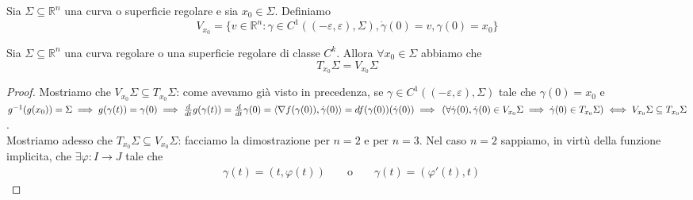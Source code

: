 \begin{definition}
Sia $\Sigma \subseteq \mathbb{R}^n$ una curva o superficie regolare e sia $x_0 \in \Sigma$. Definiamo
$$
V_{x_0} = \{ v \in \mathbb{R}^n: \gamma \in C^{1}((-\varepsilon, \varepsilon), \Sigma), \dot{\gamma}(0) = v, \gamma(0) = x_0 \}
$$
\end{definition}
\begin{theorem}
Sia $\Sigma \subseteq \mathbb{R}^n$ una curva regolare o una superficie regolare di classe $C^k$. Allora $\forall x_0 \in \Sigma$ abbiamo che
$$
T_{x_0} \Sigma = V_{x_0} \Sigma
$$
\label{thm:caratt_tang}
\end{theorem}
\begin{proof}
Mostriamo che $V_{x_0} \Sigma \subseteq T_{x_0} \Sigma$: come avevamo già visto in precedenza, se $\gamma \in C^{1}((-\varepsilon, \varepsilon), \Sigma)$ tale che $\gamma(0)=x_0$ e $g^{-1}(g(x_0)) = \Sigma \implies g(\gamma(t)) = \gamma(0) \implies \frac{d}{dt} g(\gamma(t)) = \frac{d}{dt} \gamma(0) = \langle \nabla f(\gamma(0)), \dot{\gamma}(0) \rangle = df(\gamma(0))(\dot{\gamma}(0)) \implies \, (\forall \dot{\gamma}(0), \dot{\gamma}(0) \in V_{x_0} \Sigma \implies \dot{\gamma}(0) \in T_{x_0} \Sigma) \iff V_{x_0} \Sigma \subseteq T_{x_0} \Sigma$. \\
Mostriamo adesso che $T_{x_0} \Sigma \subseteq V_{x_0} \Sigma$: facciamo la dimostrazione per $n=2$ e per $n=3$. Nel caso $n=2$ sappiamo, in virtù della funzione implicita, che $\exists \varphi: I \to J$ tale che 
\begin{align*}
&\gamma(t) = (t, \varphi(t)) & &\text{ o } & &\gamma(t)=(\varphi'(t), t)
\end{align*}


\end{proof}
